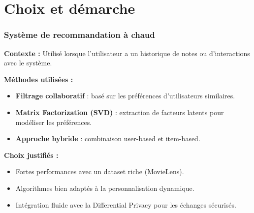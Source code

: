 \documentclass{beamer}
\begin{document}
\section{Choix et démarche}
\begin{frame}
    \scriptsize
    \frametitle{Système de recommandation à chaud}
    \textbf{Contexte :} Utilisé lorsque l’utilisateur a un historique de notes ou d’interactions avec le système.

    \vspace{0.3cm}
    \textbf{Méthodes utilisées :}
    \begin{itemize}
        \item \textbf{Filtrage collaboratif} : basé sur les préférences d’utilisateurs similaires.
        \item \textbf{Matrix Factorization (SVD)} : extraction de facteurs latents pour modéliser les préférences.
        \item \textbf{Approche hybride} : combinaison user-based et item-based.
    \end{itemize}

    \vspace{0.3cm}
    \textbf{Choix justifiés :}
    \begin{itemize}
        \item Fortes performances avec un dataset riche (MovieLens).
        \item Algorithmes bien adaptés à la personnalisation dynamique.
        \item Intégration fluide avec la Differential Privacy pour les échanges sécurisés.
    \end{itemize}
\end{frame}
\end{document}
